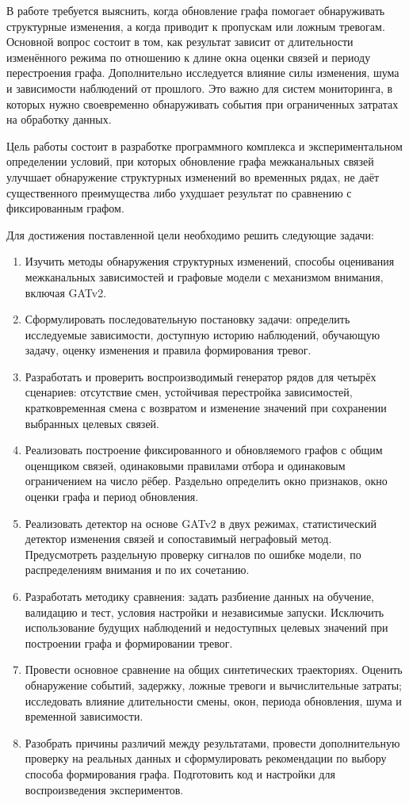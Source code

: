 \documentclass[bachelor, och, diploma]{SCWorks}
\begin{document}
В работе требуется выяснить, когда обновление графа помогает обнаруживать структурные изменения, а когда приводит к пропускам или ложным тревогам. Основной вопрос состоит в том, как результат зависит от длительности изменённого режима по отношению к длине окна оценки связей и периоду перестроения графа. Дополнительно исследуется влияние силы изменения, шума и зависимости наблюдений от прошлого. Это важно для систем мониторинга, в которых нужно своевременно обнаруживать события при ограниченных затратах на обработку данных.

Цель работы состоит в разработке программного комплекса и экспериментальном определении условий, при которых обновление графа межканальных связей улучшает обнаружение структурных изменений во временных рядах, не даёт существенного преимущества либо ухудшает результат по сравнению с фиксированным графом.

Для достижения поставленной цели необходимо решить следующие задачи:
\begin{enumerate}
    \item Изучить методы обнаружения структурных изменений, способы оценивания межканальных зависимостей и графовые модели с механизмом внимания, включая GATv2.
    \item Сформулировать последовательную постановку задачи: определить исследуемые зависимости, доступную историю наблюдений, обучающую задачу, оценку изменения и правила формирования тревог.
    \item Разработать и проверить воспроизводимый генератор рядов для четырёх сценариев: отсутствие смен, устойчивая перестройка зависимостей, кратковременная смена с возвратом и изменение значений при сохранении выбранных целевых связей.
    \item Реализовать построение фиксированного и обновляемого графов с общим оценщиком связей, одинаковыми правилами отбора и одинаковым ограничением на число рёбер. Раздельно определить окно признаков, окно оценки графа и период обновления.
    \item Реализовать детектор на основе GATv2 в двух режимах, статистический детектор изменения связей и сопоставимый неграфовый метод. Предусмотреть раздельную проверку сигналов по ошибке модели, по распределениям внимания и по их сочетанию.
    \item Разработать методику сравнения: задать разбиение данных на обучение, валидацию и тест, условия настройки и независимые запуски. Исключить использование будущих наблюдений и недоступных целевых значений при построении графа и формировании тревог.
    \item Провести основное сравнение на общих синтетических траекториях. Оценить обнаружение событий, задержку, ложные тревоги и вычислительные затраты; исследовать влияние длительности смены, окон, периода обновления, шума и временной зависимости.
    \item Разобрать причины различий между результатами, провести дополнительную проверку на реальных данных и сформулировать рекомендации по выбору способа формирования графа. Подготовить код и настройки для воспроизведения экспериментов.
\end{enumerate}
\end{document}

